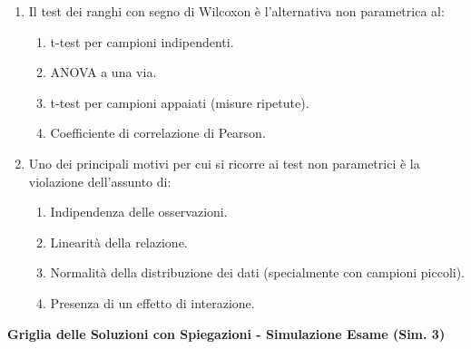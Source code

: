 \documentclass[12pt, a4paper]{article}
\begin{document}
\begin{enumerate}[resume]
    \item Il test dei ranghi con segno di Wilcoxon è l'alternativa non parametrica al:
    \begin{enumerate}
        \item t-test per campioni indipendenti.
        \item ANOVA a una via.
        \item t-test per campioni appaiati (misure ripetute).
        \item Coefficiente di correlazione di Pearson.
    \end{enumerate}
    \vspace{0.3cm}

    \item Uno dei principali motivi per cui si ricorre ai test non parametrici è la violazione dell'assunto di:
    \begin{enumerate}
        \item Indipendenza delle osservazioni.
        \item Linearità della relazione.
        \item Normalità della distribuzione dei dati (specialmente con campioni piccoli).
        \item Presenza di un effetto di interazione.
    \end{enumerate}
    \vspace{0.3cm}
\end{enumerate}

\newpage
\begin{center}
    \Large\textbf{Griglia delle Soluzioni con Spiegazioni - Simulazione Esame (Sim. 3)}
\end{center}
\vspace{1cm}
\end{document}
